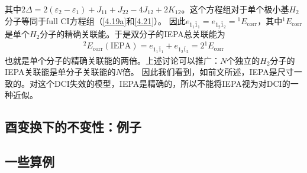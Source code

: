 其中$2\Delta=2(\varepsilon_2-\varepsilon_1)+J_{11}+J_{22}-4J_{12}+2K_{12}$。这个方程组对于单个极小基$H_2$分子等同于full CI方程组（\autoref{4.19a}和\autoref{4.21}）。
因此$e_{1_1\bar{1}_1}=e_{1_2\bar{1}_2}={}^1E_\text{corr}$，其中${}^1E_\text{corr}$是单个$H_2$分子的精确关联能。于是双分子的IEPA总关联能为
\begin{align}
    {}^2E_\text{corr}(\text{IEPA})=e_{1_1\bar{1}_1}+e_{1_2\bar{1}_2}=2{}^1E_\text{corr}
\end{align}
也就是单个分子的精确关联能的两倍。上述讨论可以推广：$N$个独立的$H_2$分子的IEPA关联能是单分子关联能的$N$倍。
因此我们看到，如前文所述，IEPA是尺寸一致的。对这个DCI失效的模型，IEPA是精确的，所以不能将IEPA视为对DCI的一种近似。

\subsection{酉变换下的不变性：例子}
\subsection{一些算例}

